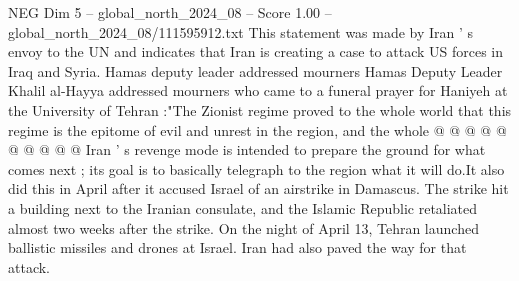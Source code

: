 \begin{textsample}{NEG Dim 5 – global\_north\_2024\_08 – Score 1.00 – global\_north\_2024\_08/111595912.txt}
This statement was made by Iran ' s envoy to the UN and indicates that Iran is creating a case to attack US forces in Iraq and Syria.
Hamas deputy leader addressed mourners Hamas Deputy Leader Khalil al-Hayya addressed mourners who came to a funeral prayer for Haniyeh at the University of Tehran :"The Zionist regime proved to the whole world that this regime is the epitome of evil and unrest in the region, and the whole @ @ @ @ @ @ @ @ @ @ Iran ' s revenge mode is intended to prepare the ground for what comes next ; its goal is to basically telegraph to the region what it will do.It also did this in April after it accused Israel of an airstrike in Damascus.
The strike hit a building next to the Iranian consulate, and the Islamic Republic retaliated almost two weeks after the strike.
On the night of April 13, Tehran launched ballistic missiles and drones at Israel.
Iran had also paved the way for that attack.

\end{textsample}
